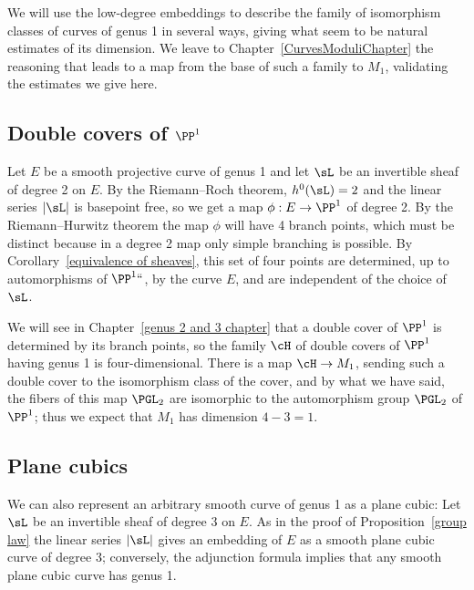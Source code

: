 We will use the low-degree embeddings  to describe the family of
isomorphism classes of curves of genus 1 in several ways, giving
what seem to be natural estimates of its dimension. We leave to Chapter~\ref{CurvesModuliChapter} the reasoning that leads to a map from the base of such a family to $M_{1}$, validating the estimates we give here.

\subsection*{Double covers of $\PP^1$}

Let $E$ be a smooth projective curve of genus 1 and let  $\sL$ be an
%
invertible sheaf of degree 2 on $E$. By the Riemann--Roch theorem,
$h^0(\sL) = 2$ and the linear series $|\sL|$ is basepoint free, so we
get a map $\phi : E \to \PP^1$ of degree 2. By the
Riemann--Hurwitz theorem
%
the map $\phi$ will have 4 branch points, which must be
distinct because in a degree 2 map
%
only simple branching is possible. By Corollary~\ref{equivalence of sheaves}, this set of four points are determined, up to automorphisms of $\PP^1` `$, by the curve $E$, and are independent of the choice of~$\sL$.


We will see in Chapter~\ref{genus 2 and 3 chapter} that a double cover
of $\PP^1$ is determined by  its branch points, so the family $\cH$ of
double covers of $\PP^1$ having genus 1 is four-dimensional. There is
a map $\cH \to M_1$, sending such a double cover to the isomorphism
class of the cover, and by what we have said, the fibers of this map
%
$\PGL_2$
%
are isomorphic to the automorphism group $\PGL_2$ of $\PP^1$; thus
we expect that $M_1$ has dimension $4-3=1$.

\subsection*{Plane cubics}

We can also represent an arbitrary smooth curve of genus 1 as a plane cubic:
%
Let $\sL$ be an invertible sheaf of degree 3 on $E$. As in the proof
of Proposition~\ref{group law} the linear series $|\sL|$ gives an
embedding of $E$ as a smooth plane cubic curve of degree 3;
conversely, the
adjunction formula
%
implies that any smooth plane cubic curve has genus 1.

